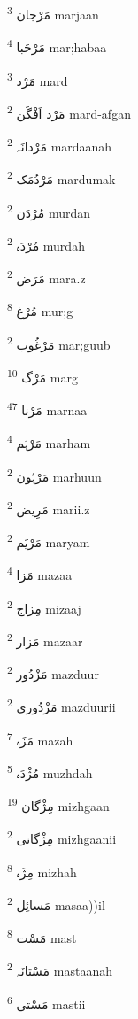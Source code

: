 \documentclass[12pt]{article}
\begin{document}
\begin{RTL}
\begin{multicols}{5}
{\ur مَرْجان}   \textsuperscript{3} marjaan

{\ur مَرْحَبا}   \textsuperscript{4} mar;habaa

{\ur مَرْد}   \textsuperscript{3} mard

{\ur مَرْد اَفْگَن}   \textsuperscript{2} mard-afgan

{\ur مَرْدانَہ}   \textsuperscript{2} mardaanah

{\ur مَرْدُمَک}   \textsuperscript{2} mardumak

{\ur مُرْدَن}   \textsuperscript{2} murdan

{\ur مُرْدَہ}   \textsuperscript{2} murdah

{\ur مَرَض}   \textsuperscript{2} mara.z

{\ur مُرْغ}   \textsuperscript{8} mur;g

{\ur مَرْغُوب}   \textsuperscript{2} mar;guub

{\ur مَرْگ}   \textsuperscript{10} marg

{\ur مَرْنا}   \textsuperscript{47} marnaa

{\ur مَرْہَم}   \textsuperscript{4} marham

{\ur مَرْہُون}   \textsuperscript{2} marhuun

{\ur مَرِیض}   \textsuperscript{2} marii.z

{\ur مَرْیَم}   \textsuperscript{2} maryam

{\ur مَزا}   \textsuperscript{4} mazaa

{\ur مِزاج}   \textsuperscript{2} mizaaj

{\ur مَزار}   \textsuperscript{2} mazaar

{\ur مَزْدُور}   \textsuperscript{2} mazduur

{\ur مَزْدُوری}   \textsuperscript{2} mazduurii

{\ur مَزَہ}   \textsuperscript{7} mazah

{\ur مُژْدَہ}   \textsuperscript{5} muzhdah

{\ur مِژْگان}   \textsuperscript{19} mizhgaan

{\ur مِژْگانی}   \textsuperscript{2} mizhgaanii

{\ur مِژَہ}   \textsuperscript{8} mizhah

{\ur مَسائِل}   \textsuperscript{2} masaa))il

{\ur مَسْت}   \textsuperscript{8} mast

{\ur مَسْتانَہ}   \textsuperscript{2} mastaanah

{\ur مَسْتی}   \textsuperscript{6} mastii


\end{multicols}
\end{RTL}
\end{document}
